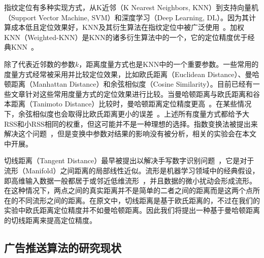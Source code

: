 指纹定位有多种实现方式，从K近邻（K Nearest Neighbors, KNN）到支持向量机（Support Vector Machine, SVM）和深度学习（Deep Learning, DL）。因为其计算成本低且定位效果好，KNN及其衍生算法在指纹定位中被广泛使用~\cite{xia2017indoor}。加权KNN（Weighted-KNN）是KNN的诸多衍生算法中的一个，它的定位精度优于经典KNN~\cite{yen2017modified}。

除了代表近邻数的参数$k$，距离度量方式也是KNN中的一个重要参数。一些常用的度量方式经常被采用并比较定位效果，比如欧氏距离（Euclidean Distance）、曼哈顿距离（Manhattan Distance）和余弦相似度（Cosine Similarity）。目前已经有一些文章针对这些常用度量方式的定位效果进行比较。当曼哈顿距离与欧氏距离和谷本距离（Tanimoto Distance）比较时，曼哈顿距离定位精度更高~\cite{marques2012combining}。在某些情况下，余弦相似度也会取得比欧氏距离更小的误差~\cite{han2015cosine}。上述所有度量方式都给予大RSS和小RSS相同的权重，但这可能并不是一种理想的选择。指数变换法被提出来解决这个问题~\cite{torres2015comprehensive}，但是变换中参数对结果的影响没有被分析，相关的实验会在本文中开展。

切线距离（Tangent Distance）最早被提出以解决手写数字识别问题~\cite{simard1998transformation}，它是对于流形（Manifold）之间距离的局部线性近似。流形是机器学习领域中的经典假设，即高维输入数据一般都居于或邻近低维流形~\cite{roweis2000nonlinear}，并且数据的微小扰动会形成流形。在这种情况下，两点之间的真实距离并不是简单的二者之间的距离而是这两个点所在的不同流形之间的距离。在原文中，切线距离是基于欧氏距离的，不过在我们的实验中欧氏距离定位精度并不如曼哈顿距离。因此我们将提出一种基于曼哈顿距离的切线距离来提高定位精度。

\subsection{广告推送算法的研究现状}

